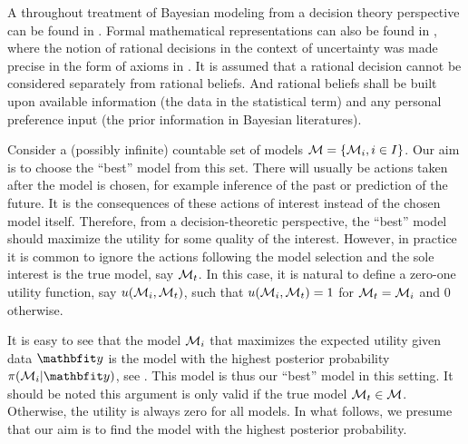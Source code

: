 A throughout treatment of Bayesian modeling from a decision theory perspective
can be found in \cite{Robert:2007tc}. Formal mathematical representations
can also be found in \cite[][sec.~5.1 and sec.~6.1]{Bernardo:1994vd},
where the notion of rational decisions in the context of uncertainty was made
precise in the form of axioms in \cite[][chap.~2]{Bernardo:1994vd}. It is
assumed that a rational decision cannot be considered separately from rational
beliefs. And rational beliefs shall be built upon available information (the
data in the statistical term) and any personal preference input (the prior
information in Bayesian literatures).

Consider a (possibly infinite) countable set of models $\mathcal{M} = \{\mathcal{M}_i,
i\in I\}$. Our aim is to choose the ``best'' model from this set. There will
usually be actions taken after the model is chosen, for example inference of
the past or prediction of the future. It is the consequences of these actions
of interest instead of the chosen model itself. Therefore, from a
decision-theoretic perspective, the ``best'' model should maximize the utility
for some quality of the interest. However, in practice it is common to ignore
the actions following the model selection and the sole interest is the true
model, say $\mathcal{M}_t$. In this case, it is natural to define a zero-one utility
function, say $u(\mathcal{M}_i,\mathcal{M}_t)$, such that $u(\mathcal{M}_i,\mathcal{M}_t) = 1$ for
$\mathcal{M}_t = \mathcal{M}_i$ and $0$ otherwise.

It is easy to see that the model $\mathcal{M}_i$ that maximizes the expected utility
given data $\data$ is the model with the highest posterior probability
$\pi(\calM_i|\data)$, see \cite[][chap.~6]{Bernardo:1994vd}. This model is
thus our ``best'' model in this setting. It should be noted this argument is
only valid if the true model $\mathcal{M}_t \in \mathcal{M}$. Otherwise, the utility is
always zero for all models. In what follows, we presume that our aim is to
find the model with the highest posterior probability.

